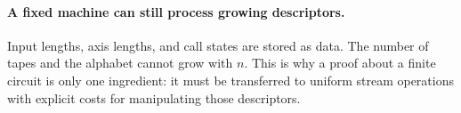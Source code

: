 \paragraph{A fixed machine can still process growing descriptors.}
Input lengths, axis lengths, and call states are stored as data. The number
of tapes and the alphabet cannot grow with $n$. This is why a proof about a
finite circuit is only one ingredient: it must be transferred to uniform
stream operations with explicit costs for manipulating those descriptors.


